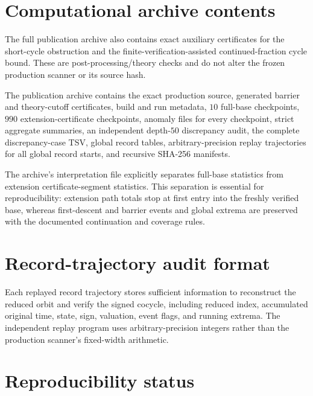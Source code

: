 \documentclass[11pt]{article}
\theoremstyle{definition}
\theoremstyle{remark}
\begin{document}
\section{Computational archive contents}
The full publication archive also contains exact auxiliary certificates for the short-cycle obstruction and the finite-verification-assisted continued-fraction cycle bound.  These are post-processing/theory checks and do not alter the frozen production scanner or its source hash.


The publication archive contains the exact production source, generated barrier and theory-cutoff certificates, build and run metadata, $10$ full-base checkpoints, $990$ extension-certificate checkpoints, anomaly files for every checkpoint, strict aggregate summaries, an independent depth-$50$ discrepancy audit, the complete discrepancy-case TSV, global record tables, arbitrary-precision replay trajectories for all global record starts, and recursive SHA-256 manifests.

The archive's interpretation file explicitly separates full-base statistics from extension certificate-segment statistics.  This separation is essential for reproducibility: extension path totals stop at first entry into the freshly verified base, whereas first-descent and barrier events and global extrema are preserved with the documented continuation and coverage rules.

\section{Record-trajectory audit format}

Each replayed record trajectory stores sufficient information to reconstruct the reduced orbit and verify the signed cocycle, including reduced index, accumulated original time, state, sign, valuation, event flags, and running extrema.  The independent replay program uses arbitrary-precision integers rather than the production scanner's fixed-width arithmetic.

\section{Reproducibility status}
\end{document}
